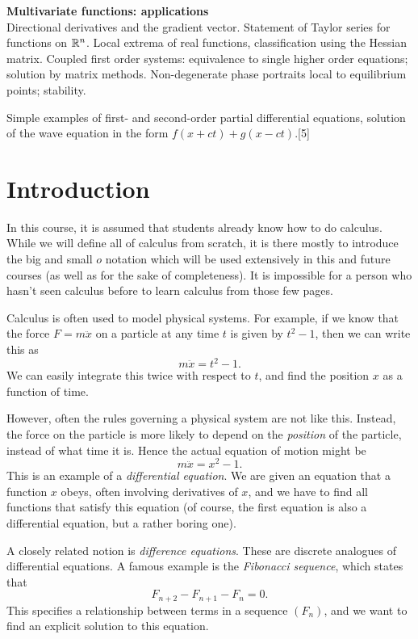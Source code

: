 \documentclass[a4paper]{article}
\begin{document}
{  \vspace{10pt}
  \noindent\textbf{Multivariate functions: applications}\\
  Directional derivatives and the gradient vector. Statement of Taylor series for functions on $\mathbb{R}^n$. Local extrema of real functions, classification using the Hessian matrix. Coupled first order systems: equivalence to single higher order equations; solution by matrix methods. Non-degenerate phase portraits local to equilibrium points; stability.

  \vspace{5pt}
  \noindent Simple examples of first- and second-order partial differential equations, solution of the wave equation in the form $f(x + ct) + g(x - ct)$.\hspace*{\fill}[5]}
\tableofcontents

\setcounter{section}{-1}
\section{Introduction}
In this course, it is assumed that students already know how to do calculus. While we will define all of calculus from scratch, it is there mostly to introduce the big and small $o$ notation which will be used extensively in this and future courses (as well as for the sake of completeness). It is impossible for a person who hasn't seen calculus before to learn calculus from those few pages.

Calculus is often used to model physical systems. For example, if we know that the force $F = m\ddot x$ on a particle at any time $t$ is given by $t^2 - 1$, then we can write this as
\[
  m\ddot x = t^2 - 1.
\]
We can easily integrate this twice with respect to $t$, and find the position $x$ as a function of time.

However, often the rules governing a physical system are not like this. Instead, the force on the particle is more likely to depend on the \emph{position} of the particle, instead of what time it is. Hence the actual equation of motion might be
\[
  m\ddot x = x^2 - 1.
\]
This is an example of a \emph{differential equation}. We are given an equation that a function $x$ obeys, often involving derivatives of $x$, and we have to find all functions that satisfy this equation (of course, the first equation is also a differential equation, but a rather boring one).

A closely related notion is \emph{difference equations}. These are discrete analogues of differential equations. A famous example is the \emph{Fibonacci sequence}, which states that
\[
  F_{n + 2} - F_{n + 1} - F_n = 0.
\]
This specifies a relationship between terms in a sequence $(F_n)$, and we want to find an explicit solution to this equation.
\end{document}
